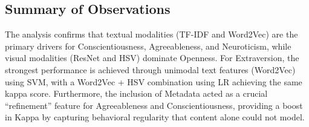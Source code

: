 \subsection{Summary of Observations}
The analysis confirms that textual modalities (TF-IDF and Word2Vec) are the primary drivers for Conscientiousness, Agreeableness, and Neuroticism, while visual modalities (ResNet and HSV) dominate Openness. For Extraversion, the strongest performance is achieved through unimodal text features (Word2Vec) using SVM, with a Word2Vec + HSV combination using LR achieving the same kappa score. Furthermore, the inclusion of Metadata acted as a crucial “refinement” feature for Agreeableness and Conscientiousness, providing a boost in Kappa by capturing behavioral regularity that content alone could not model.

